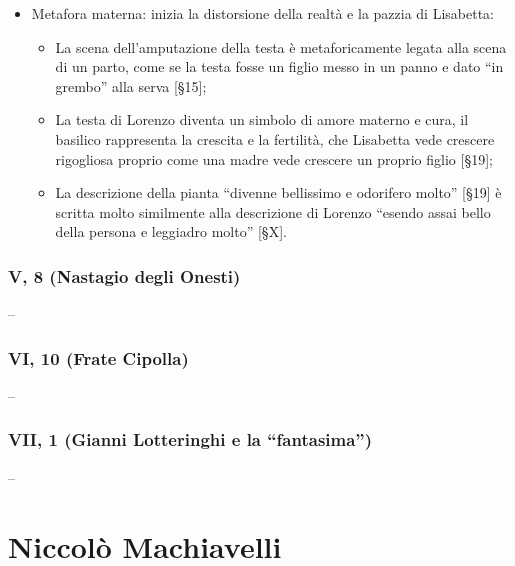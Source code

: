 \documentclass{article}
\begin{document}
\begin{enumerate}
\begin{subenumerate}
\begin{itemize}
                    \item Metafora materna: inizia la distorsione della realtà e la pazzia
                        di Lisabetta:
                        \begin{itemize}
                            \item La scena dell'amputazione della testa è metaforicamente
                                legata alla scena di un parto, come se la testa fosse un
                                figlio messo in un panno e dato ``in grembo'' alla serva
                                [§15];
                            \item La testa di Lorenzo diventa un simbolo di
                                amore materno e cura, il basilico rappresenta la crescita e
                                la fertilità, che Lisabetta vede crescere rigogliosa proprio
                                come una madre vede crescere un proprio figlio [§19];
                            \item La descrizione della pianta ``divenne bellissimo e 
                                odorifero molto'' [§19] è scritta molto similmente alla
                                descrizione di Lorenzo ``esendo assai bello della persona e
                                leggiadro molto'' [§X].
                        \end{itemize}
                \end{itemize}
        \end{subenumerate}
\end{enumerate}

\newpage
\subsubsection{V, 8 (Nastagio degli Onesti)}

--

\newpage
\subsubsection{VI, 10 (Frate Cipolla)}

--

\newpage
\subsubsection{VII, 1 (Gianni Lotteringhi e la ``fantasima'')}

--

\newpage
\section{Niccolò Machiavelli}
\end{document}
